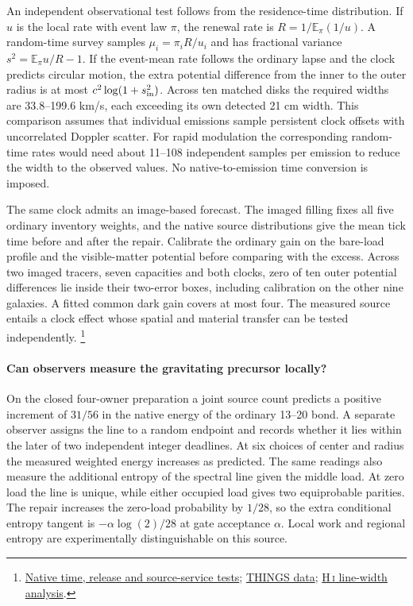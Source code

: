\documentclass[11pt]{article}
\begin{document}
An independent observational test follows from the residence-time
distribution. If \(u\) is the local rate with event law \(\pi\), the
renewal rate is \(R=1/\mathbb{E}_\pi(1/u)\).
A random-time survey samples \(\mu_i=\pi_i R/u_i\) and has fractional
variance \(s^2=\mathbb{E}_\pi u/R-1\). If the event-mean rate follows
the ordinary lapse and the clock predicts circular motion, the extra
potential difference from the inner to the outer radius is at most
\(c^2\log(1+s_{\rm in}^2)\). Across ten matched disks the required
widths are 33.8--199.6 km/s, each exceeding its own detected
21 cm width. This comparison assumes that individual emissions
sample persistent clock offsets with uncorrelated Doppler scatter.
For rapid modulation the corresponding random-time rates would need
about 11--108 independent samples per emission to reduce the width
to the observed values. No native-to-emission time conversion is imposed.

The same clock admits an image-based forecast. The imaged filling fixes
all five ordinary inventory weights, and the native source distributions
give the mean tick time before and after the repair. Calibrate the
ordinary gain on the bare-load profile and the visible-matter potential
before comparing with the excess. Across two imaged tracers, seven
capacities and both clocks, zero of ten outer potential differences
lie inside their two-error boxes, including calibration on the other
nine galaxies. A fitted common dark gain covers at most four.
The measured source entails a clock effect whose spatial and material
transfer can be tested independently.%
\footnote{\href{https://github.com/FloatingPragma/observer-patch-holography/blob/main/model/experiments/interval_echo_shell_flux/product_address/green_response/material_recoil/overlap_source/native_boundary/stock/aperture/RENEWAL_RESULTS.md}{Native time, release and source-service tests};
\href{https://www2.mpia-hd.mpg.de/THINGS/Data.html}{THINGS data};
\href{https://arxiv.org/abs/0903.0183}{H\,\textsc{i} line-width analysis}.}

\paragraph{Can observers measure the gravitating precursor locally?}
On the closed four-owner preparation a joint source count predicts
a positive increment of $31/56$ in the native energy of the ordinary
13--20 bond. A separate observer assigns the line to a random endpoint
and records whether it lies within the later of two independent integer
deadlines. At six choices of center and radius the measured weighted
energy increases as predicted. The same readings also measure the
additional entropy of the spectral line given the middle load. At
zero load the line is unique, while either occupied load gives two
equiprobable parities. The repair increases the zero-load probability
by $1/28$, so the extra conditional entropy tangent is
$-\alpha\log(2)/28$ at gate acceptance $\alpha$. Local work and
regional entropy are experimentally distinguishable on this source.
\end{document}
